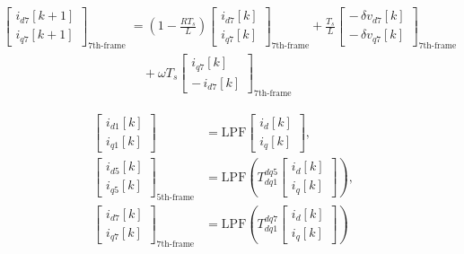 \begin{equation}
\begin{aligned}
\begin{bmatrix}
i_{d7}[k+1]\\
i_{q7}[k+1]
\end{bmatrix}_{\text{7th-frame}}
&=
\left(1 - \frac{R T_s}{L}\right)
\begin{bmatrix}
i_{d7}[k]\\
i_{q7}[k]
\end{bmatrix}_{\text{7th-frame}}
+
\frac{T_s}{L}
\begin{bmatrix}
-\,\delta v_{d7}[k]\\
-\,\delta v_{q7}[k]
\end{bmatrix}_{\text{7th-frame}}\\
&\quad
+ \omega T_s
\begin{bmatrix}
i_{q7}[k]\\
-\,i_{d7}[k]
\end{bmatrix}_{\text{7th-frame}}
\end{aligned}
\label{eq:id7_predict}
\end{equation}


\begin{equation}
\begin{aligned}
\begin{bmatrix}
i_{d1}[k]\\
i_{q1}[k]
\end{bmatrix}
&=
\mathrm{LPF}
\begin{bmatrix}
i_d[k]\\
i_q[k]
\end{bmatrix},
\\[6pt]
\begin{bmatrix}
i_{d5}[k]\\
i_{q5}[k]
\end{bmatrix}_{\text{5th-frame}}
&=
\mathrm{LPF}\!\left(
T_{dq1}^{dq5}
\begin{bmatrix}
i_d[k]\\
i_q[k]
\end{bmatrix}
\right),
\\[6pt]
\begin{bmatrix}
i_{d7}[k]\\
i_{q7}[k]
\end{bmatrix}_{\text{7th-frame}}
&=
\mathrm{LPF}\!\left(
T_{dq1}^{dq7}
\begin{bmatrix}
i_d[k]\\
i_q[k]
\end{bmatrix}
\right)
\end{aligned}
\end{equation}

